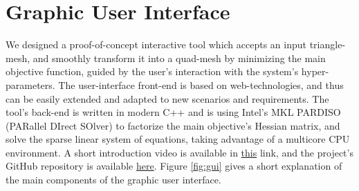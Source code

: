 \section{Graphic User Interface}
\label{section:graphic_user_interface}
We designed a proof-of-concept interactive tool which accepts an input triangle-mesh, and smoothly transform it into a quad-mesh by minimizing the main objective function, guided by the user's interaction with the system's hyper-parameters. The user-interface front-end is based on web-technologies, and thus can be easily extended and adapted to new scenarios and requirements. The tool's back-end is written in modern C++ and is using Intel's MKL PARDISO (PARallel DIrect SOlver) to factorize the main objective's Hessian matrix, and solve the sparse linear system of equations, taking advantage of a multicore CPU environment. A short introduction video is available in  \href{https://youtu.be/1zP5KO8EwHQ}{this} link, and the project's GitHub repository is available \href{https://github.com/HaifaGraphics/RDS/tree/royv}{here}. Figure \ref{fig:gui} gives a short explanation of the main components of the graphic user interface.
